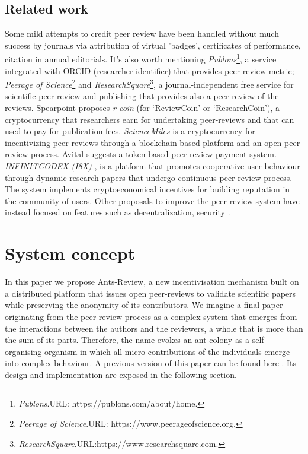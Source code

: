 \documentclass[runningheads]{llncs}
\begin{document}
\subsection{Related work} Some mild attempts to credit peer review have been handled without much success by journals via attribution of virtual 'badges', certificates of performance, citation in annual editorials.
\newline It's also worth mentioning \emph{Publons}\footnote[1]{\emph{Publons}.\textsc{URL:} https://publons.com/about/home.}, a service integrated with ORCID (researcher identifier) that provides peer-review metric; \emph{Peerage of Science}\footnote[2]{\emph{Peerage of Science}.\textsc{URL:} https://www.peerageofscience.org.} and \emph{ResearchSquare}\footnote[3]{\emph{ResearchSquare}.\textsc{URL:}https://www.researchsquare.com.}, a journal-independent free service for scientific peer review and publishing that provides also a peer-review of the reviews. Spearpoint\cite{ResearchCoin} proposes \emph{r-coin} (for ‘ReviewCoin’ or ‘ResearchCoin’), a cryptocurrency that researchers earn for undertaking peer-reviews and that can used to pay for publication fees. \emph{ScienceMiles} \cite{ScienceMiles} is a cryptocurrency for incentivizing peer-reviews through a blockchain-based platform and an open peer-review process. Avital \cite{AvitalToken} suggests a token-based peer-review payment system. \emph{INFINITCODEX (I8X)} \cite{I8X}, is a platform that promotes cooperative user behaviour through dynamic research papers that undergo  continuous peer review process. The system implements cryptoeconomical incentives for building reputation in the community of users. \newline Other proposals to improve the peer-review system have instead focused on features such as decentralization, security \cite{Pevo,CryptSubmit,MarsChain}.

\section{System concept}
In this paper we propose Ants-Review, a new incentivisation mechanism built on a distributed platform that issues open peer-reviews to validate scientific papers while preserving the anonymity of its contributors. We imagine a final paper originating from the peer-review process as a complex system that emerges from the interactions between the authors and the reviewers, a whole that is more than the sum of its parts. Therefore, the name evokes an ant colony as a self-organising organism in which all micro-contributions of the individuals emerge into complex behaviour.
\newline A previous version of this paper can be found here \cite{AntsReview}.
\newline Its design and implementation are exposed in the following section.
\end{document}
